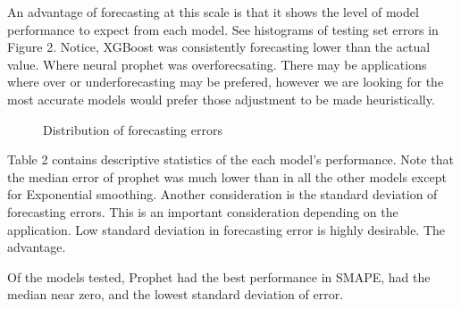\documentclass[16pt,twocolumn,letterpaper]{article}
\begin{document}
An advantage of forecasting at this scale is that it shows the level of model performance to expect from each model. See histograms of testing set errors in Figure 2. Notice, XGBoost was consistently forecasting lower than the actual value. Where neural prophet was overforecsating. There may be applications where over or underforecasting may be prefered, however we are looking for the most accurate models would prefer those adjustment to be made heuristically. 

\begin{figure}[!htb]
	\caption{\label{fig:my-label} Distribution of forecasting errors}
\end{figure}

Table 2 contains descriptive statistics of the each model's performance. Note that the median error of prophet was much lower than in all the other models except for Exponential smoothing. Another consideration is the standard deviation of forecasting errors. This is an important consideration depending on the application. Low standard deviation in forecasting error is highly desirable. The advantage.

Of the models tested, Prophet had the best performance in SMAPE, had the median near zero, and the lowest standard deviation of error. 
\end{document}
